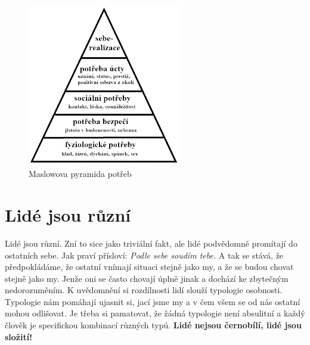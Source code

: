 \documentclass[a4paper,12pt]{report}
\begin{document}
\begin{figure}[hp!]
\pagelogos
\begin{center}
    \includegraphics[width=0.6\textwidth]{zdroje/maslowova-pyramida-lidskych-potreb.png}
    \caption{Maslowova pyramida potřeb}
    \label{Maslowova-pyramida-potreb}
\end{center} 
\end{figure}

\section{Lidé jsou různí}
\pagelogos
Lidé jsou různí. Zní to sice jako triviální fakt, ale lidé podvědomně promítají do ostatních sebe. Jak praví přísloví: \textit{Podle sebe soudím tebe.} A tak se stává, že předpokládáme, že ostatní vnímají situaci stejně jako my, a že se budou chovat stejně jako my.
Jenže oni se často chovají úplně jinak a dochází ke zbytečným nedorozuměním.
K uvědomnění si rozdílnosti lidí slouží typologie osobnosti. Typologie nám pomáhají ujasnit si, jací jsme my a v čem všem se od nás ostatní mohou odlišovat. Je třeba si pamatovat, že žádná typologie není absulitní a každý člověk je specifickou kombinací různých typú. \textbf{Lidé nejsou černobílí, lidé jsou složití!}
\end{document}
